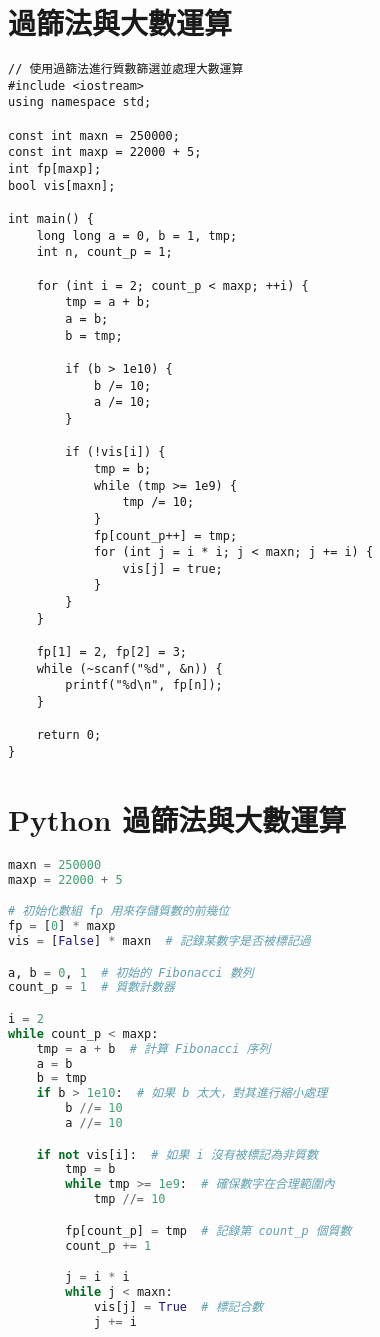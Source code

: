 \documentclass{article}
\begin{document}
\begin{multicols}{2}
\section{過篩法與大數運算}

\begin{lstlisting}
// 使用過篩法進行質數篩選並處理大數運算
#include <iostream>
using namespace std;

const int maxn = 250000;
const int maxp = 22000 + 5;
int fp[maxp];
bool vis[maxn];

int main() {
    long long a = 0, b = 1, tmp;
    int n, count_p = 1;

    for (int i = 2; count_p < maxp; ++i) {
        tmp = a + b;
        a = b;
        b = tmp;

        if (b > 1e10) {
            b /= 10;
            a /= 10;
        }

        if (!vis[i]) {
            tmp = b;
            while (tmp >= 1e9) {
                tmp /= 10;
            }
            fp[count_p++] = tmp;
            for (int j = i * i; j < maxn; j += i) {
                vis[j] = true;
            }
        }
    }

    fp[1] = 2, fp[2] = 3;
    while (~scanf("%d", &n)) {
        printf("%d\n", fp[n]);
    }

    return 0;
}
\end{lstlisting}

\section{Python 過篩法與大數運算}

\begin{lstlisting}[language=Python]
maxn = 250000
maxp = 22000 + 5

# 初始化數組 fp 用來存儲質數的前幾位
fp = [0] * maxp
vis = [False] * maxn  # 記錄某數字是否被標記過

a, b = 0, 1  # 初始的 Fibonacci 數列
count_p = 1  # 質數計數器

i = 2
while count_p < maxp:
    tmp = a + b  # 計算 Fibonacci 序列
    a = b
    b = tmp
    if b > 1e10:  # 如果 b 太大，對其進行縮小處理
        b //= 10
        a //= 10

    if not vis[i]:  # 如果 i 沒有被標記為非質數
        tmp = b
        while tmp >= 1e9:  # 確保數字在合理範圍內
            tmp //= 10

        fp[count_p] = tmp  # 記錄第 count_p 個質數
        count_p += 1

        j = i * i
        while j < maxn:
            vis[j] = True  # 標記合數
            j += i


\end{lstlisting}
\end{multicols}
\end{document}
